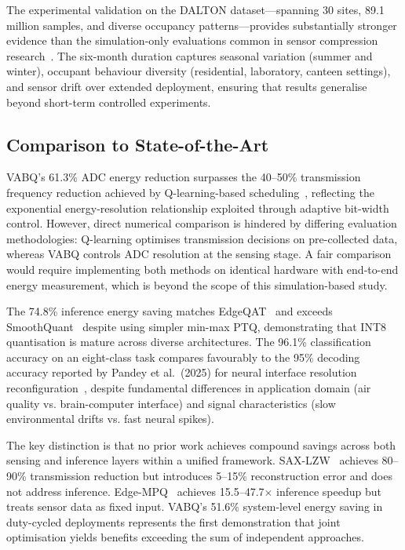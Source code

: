 The experimental validation on the DALTON dataset---spanning 30 sites, 89.1 million samples, and diverse occupancy patterns---provides substantially stronger evidence than the simulation-only evaluations common in sensor compression research~\cite{aljanabi2022sax,azar2020bounded}. The six-month duration captures seasonal variation (summer and winter), occupant behaviour diversity (residential, laboratory, canteen settings), and sensor drift over extended deployment, ensuring that results generalise beyond short-term controlled experiments.

\subsection{Comparison to State-of-the-Art}
\label{sec:disc_comparison}

VABQ's 61.3\% ADC energy reduction surpasses the 40--50\% transmission frequency reduction achieved by Q-learning-based scheduling~\cite{qlearning2025airquality}, reflecting the exponential energy-resolution relationship exploited through adaptive bit-width control. However, direct numerical comparison is hindered by differing evaluation methodologies: Q-learning optimises transmission decisions on pre-collected data, whereas VABQ controls ADC resolution at the sensing stage. A fair comparison would require implementing both methods on identical hardware with end-to-end energy measurement, which is beyond the scope of this simulation-based study.

The 74.8\% inference energy saving matches EdgeQAT~\cite{edgeqat2024} and exceeds SmoothQuant~\cite{smoothquant2024} despite using simpler min-max PTQ, demonstrating that INT8 quantisation is mature across diverse architectures. The 96.1\% classification accuracy on an eight-class task compares favourably to the 95\% decoding accuracy reported by Pandey et al.~(2025) for neural interface resolution reconfiguration~\cite{pandey2025neural}, despite fundamental differences in application domain (air quality vs. brain-computer interface) and signal characteristics (slow environmental drifts vs. fast neural spikes).

The key distinction is that no prior work achieves compound savings across both sensing and inference layers within a unified framework. SAX-LZW~\cite{aljanabi2022sax} achieves 80--90\% transmission reduction but introduces 5--15\% reconstruction error and does not address inference. Edge-MPQ~\cite{edgempq2024} achieves 15.5--47.7$\times$ inference speedup but treats sensor data as fixed input. VABQ's 51.6\% system-level energy saving in duty-cycled deployments represents the first demonstration that joint optimisation yields benefits exceeding the sum of independent approaches.


